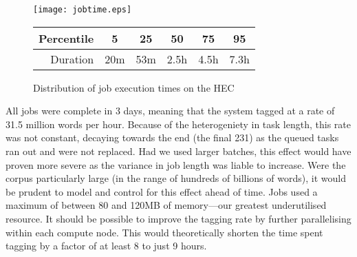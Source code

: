 % 
% 
% 
% 
% 

\begin{figure}[h]
    \centering
    \texttt{[image: jobtime.eps]}

    \begin{tabular}{ | r | c | c | c | c | c | }
        \hline
        Percentile & 5 & 25 & 50 & 75 & 95 \\ \hline
        Duration & 20m & 53m & 2.5h & 4.5h & 7.3h \\ \hline
    \end{tabular}

    \caption{Distribution of job execution times on the HEC}
    \label{fig:jobtimes}
\end{figure}


% 
% 
% 
% 




All jobs were complete in 3 days, meaning that the system tagged at a rate of 31.5 million words 
per hour.  Because of the heterogeniety in task length, this rate was not constant, decaying towards the end (the final 231) as the queued tasks ran out and were not replaced.  Had we used larger batches, this effect would have proven more severe as the variance in job length was liable to increase.  Were the corpus particularly large (in the range of hundreds of billions of words), it would be prudent to model and control for this effect ahead of time.
Jobs used a maximum of between 80 and 120MB of memory---our greatest underutilised resource.
It should be possible to improve the tagging rate by further parallelising within each compute node.  This would theoretically shorten the time spent tagging by a factor of at least 8 to just 9 hours.

